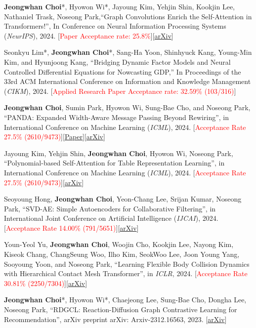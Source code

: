 \documentclass[10pt]{article}
\newenvironment{changemargin}[2]{
  \begin{list}{}{
    \setlength{\topsep}{0pt}
    \setlength{\leftmargin}{#1}
    \setlength{\rightmargin}{#2}
    \setlength{\listparindent}{\parindent}
    \setlength{\itemindent}{\parindent}
    \setlength{\parsep}{\parskip}
  }
  \item[]}{\end{list}
}
\newcommand{\presentation}[2]{
	{#1} \hfill \emph{#2}\\ \bigskip
}
\newcommand{\RED}[1]{\textcolor{red}{#1}}
\newenvironment{body} {
	\vspace*{-16pt}
	\begin{changemargin}{-0.25in}{-0.5in}
  }
	{\end{changemargin}
}
\begin{document}
\begin{body}
\presentation{
\textbf{Jeongwhan Choi}*, Hyowon Wi*, Jayoung Kim, Yehjin Shin, Kookjin Lee, Nathaniel Trask, Noseong Park,``Graph Convolutions Enrich the Self-Attention in Transformers!'', In Conference on Neural Information Processing Systems (\textit{NeurIPS}), 2024. [\RED{Paper Acceptance rate: 25.8\%}][\href{https://arxiv.org/abs/2312.04234}{arXiv}]}{}

\presentation{
 Seonkyu Lim*, \textbf{Jeongwhan Choi}*, Sang-Ha Yoon, Shinhyuck Kang, Young-Min Kim, and Hyunjoong Kang, ``Bridging Dynamic Factor Models and Neural Controlled Differential Equations for Nowcasting GDP,'' In Proceedings of the 33rd ACM International Conference on Information and Knowledge Management (\textit{CIKM}), 2024. [\RED{Applied Research Paper Acceptance rate: 32.59\% (103/316)}]}{}

\presentation{
 \textbf{Jeongwhan Choi}, Sumin Park, Hyowon Wi,  Sung-Bae Cho, and Noseong Park, ``PANDA: Expanded Width-Aware Message Passing Beyond Rewiring'', in International Conference on Machine Learning (\textit{ICML}), 2024. [\RED{Acceptance Rate 27.5\% (2610/9473)}][\href{https://proceedings.mlr.press/v235/choi24f.html}{Paper}][\href{https://arxiv.org/abs/2406.03671}{arXiv}]}{}

 \presentation{
Jayoung Kim, Yehjin Shin, \textbf{Jeongwhan Choi}, Hyowon Wi, Noseong Park, ``Polynomial-based Self-Attention for Table Representation Learning'',  in International Conference on Machine Learning (\textit{ICML}), 2024. [\RED{Acceptance Rate 27.5\% (2610/9473)}][\href{https://arxiv.org/abs/2312.07753}{arXiv}]}{}

\presentation{
 Seoyoung Hong, \textbf{Jeongwhan Choi}, Yeon-Chang Lee, Srijan Kumar, Noseong Park, ``SVD-AE: Simple Autoencoders for Collaborative Filtering'', in International Joint Conference on Artificial Intelligence (\textit{IJCAI}), 2024. [\RED{Acceptance Rate 14.00\% (791/5651)}][\href{https://arxiv.org/abs/2405.04746}{arXiv}]}{}

\presentation{
 Youn-Yeol Yu, \textbf{Jeongwhan Choi}, Woojin Cho, Kookjin Lee, Nayong Kim, Kiseok Chang, ChangSeung Woo, Ilho Kim, SeokWoo Lee, Joon Young Yang, Sooyoung Yoon, and Noseong Park, ``Learning Flexible Body Collision Dynamics with Hierarchical Contact Mesh Transformer'',  in \textit{ICLR}, 2024. [\RED{Acceptance Rate  30.81\% (2250/7304)}][\href{https://arxiv.org/abs/2312.12467}{arXiv}]}{}
 
\presentation{
\textbf{Jeongwhan Choi}*, Hyowon Wi*, Chaejeong Lee, Sung-Bae Cho, Dongha Lee, Noseong Park, ``RDGCL: Reaction-Diffusion Graph Contrastive Learning for Recommendation'',  arXiv preprint arXiv: Arxiv-2312.16563, 2023. [\href{https://arxiv.org/abs/2312.16563}{arXiv}]}{}


\end{body}
\end{document}
